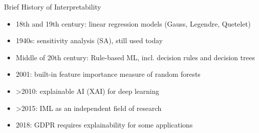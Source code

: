 \documentclass[11pt,compress,t,notes=noshow, xcolor=table]{beamer}
\begin{document}
	\begin{vbframe}{Brief History of Interpretability}
		\begin{itemize}
			\item 18th and 19th century: linear regression models (Gauss, Legendre, Quetelet)
			\item 1940s: sensitivity analysis (SA), still used today
			\item Middle of 20th century: Rule-based ML, incl. decision rules and decision trees
			\item 2001: built-in feature importance measure of random forests
			\item >2010: explainable AI (XAI) for deep learning
			\item >2015: IML as an independent field of research 
			\item 2018: GDPR requires explainability for some applications 
		\end{itemize}
	\end{vbframe}
	
	
\end{document}
